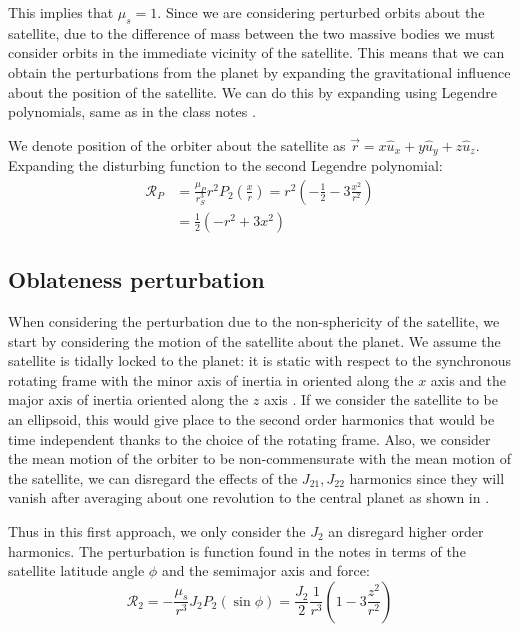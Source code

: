 This implies that $\mu_s=1$. Since we are considering perturbed orbits about the satellite, due to the difference of mass between the two massive bodies we must consider orbits in the immediate vicinity of the satellite. This means that we can obtain the perturbations from the planet by expanding the gravitational influence about the position of the satellite. We can do this by expanding using Legendre polynomials, same as in the class notes \cite{longuskiaae690}.

We denote position of the orbiter about the satellite as $\vec{r} = x \hat{u}_x + y \hat{u}_y + z \hat{u}_z$. Expanding the disturbing function to the second Legendre polynomial:
\begin{equation}
\begin{aligned}
\mathcal{R}_P &= \frac{\mu_P}{r_S^3} r^2 P_2 \left(\frac{x}{r}\right) = r^2 \left(-\frac{1}{2}-3\frac{x^2}{r^2}\right) \\
&= \frac{1}{2}(-r^2 + 3 x^2)
\end{aligned}
\end{equation}

\subsection{Oblateness perturbation}
When considering the perturbation due to the non-sphericity of the satellite, we start by considering the motion of the satellite about the planet. We assume the satellite is tidally locked to the planet: it is static with respect to the synchronous rotating frame with the minor axis of inertia in oriented along the $x$ axis and the major axis of inertia oriented along the $z$ axis \cite{paskowitz2006design}. If we consider the satellite to be an ellipsoid, this would give place to the second order harmonics that would be time independent thanks to the choice of the rotating frame. Also, we consider the mean motion of the orbiter to be non-commensurate with the mean motion of the satellite, we can disregard the effects of the $J_{21},J_{22}$ harmonics since they will vanish after averaging about one revolution to the central planet as shown in \cite{paskowitz2006design}.

Thus in this first approach, we only consider the $J_2$ an disregard higher order harmonics. The perturbation is function found in the notes \cite{longuskiaae690} in terms of the satellite latitude angle $\phi$ and the semimajor axis and force:
\begin{equation}
\mathcal{R}_2 = -\frac{\mu_s}{r^3} J_2 P_2\left(\sin \phi\right) = \frac{J_2}{2} \frac{1}{r^3} \left(1 - 3 \frac{z^2}{r^2}\right)
\end{equation}

